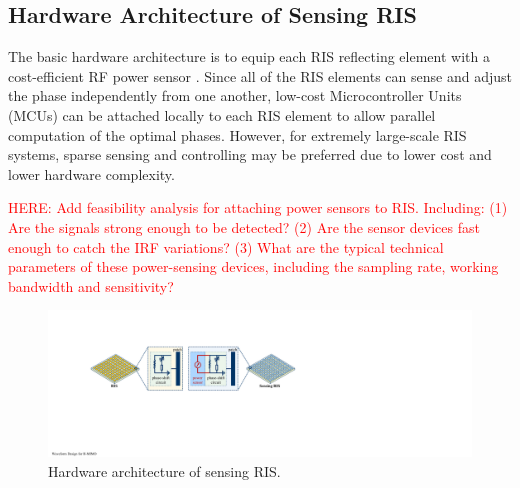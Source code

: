 \documentclass[12pt,draftclsnofoot,journal,onecolumn]{IEEEtran}
\theoremstyle{nonumberplain}
\begin{document}
\subsection{Hardware Architecture of Sensing RIS} \label{Hardware Architecture of Sensing RIS}
The basic hardware architecture is to equip each RIS reflecting element with a cost-efficient RF power sensor \cite{ma2020smartsensing}. Since all of the RIS elements can sense and adjust the phase independently from one another, low-cost Microcontroller Units (MCUs) can be attached locally to each RIS element to allow parallel computation of the optimal phases. However, for extremely large-scale RIS systems, sparse sensing and controlling may be preferred due to lower cost and lower hardware complexity. 

\textcolor{red}{HERE: Add feasibility analysis for attaching power sensors to RIS. Including: (1) Are the signals strong enough to be detected? (2) Are the sensor devices fast enough to catch the IRF variations? (3) What are the typical technical parameters of these power-sensing devices, including the sampling rate, working bandwidth and sensitivity?}

    \begin{figure}[htbp]
        \centering
        \includegraphics[width=\textwidth]{figures/hardware.pdf}
        \caption{Hardware architecture of sensing RIS.}
        \label{fig:hardware}
    \end{figure}
\end{document}
